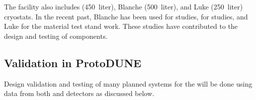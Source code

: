 The  facility also includes  (\SI {450} {liter}), Blanche (\SI {500} {liter}), and Luke (\SI {250} {liter}) cryostats. %
In the recent past, Blanche has been used for  studies,   for  studies, and Luke for the material test stand work. These studies have contributed to the design and testing of   components.

\subsection{Validation in ProtoDUNE}
\label{sec:pddp-cryo-valid}


Design validation and testing of many planned  systems for the    will be done using data from both  and  detectors as discussed below.

